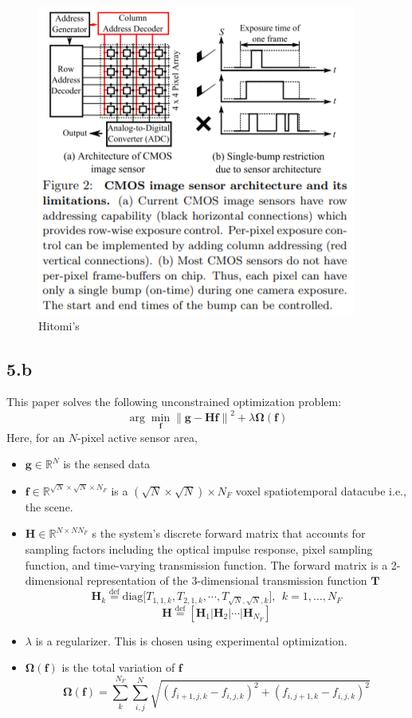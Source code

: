 \documentclass[12pt]{article}
\begin{document}
\begin{figure}[ht]
	\centering
	\includegraphics[scale=0.75]{Hitomi.png}
	\caption{Hitomi's}
\end{figure}
\subsection*{5.b}
This paper solves the following unconstrained optimization problem:
$$\arg \min_{\mathbf{f}}\left\lVert\mathbf{g - Hf}\right\rVert^2 + \lambda \mathbf{\Omega}(\mathbf{f}) $$
Here, for an $N$-pixel active sensor area, 
\begin{itemize}
\item $\mathbf{g} \in \mathbb{R}^N$ is the sensed data
\item $\mathbf{f} \in \mathbb{R}^{\sqrt{N} \times \sqrt{N} \times N_F}$ is a $(\sqrt{N} \times \sqrt{N}) \times N_F$ voxel spatiotemporal datacube i.e., the scene.
\item $\mathbf{H} \in \mathbb{R}^{N\times NN_F}$ s the system’s discrete forward matrix that accounts for sampling factors
including the optical impulse response, pixel sampling function, and time-varying transmission
function. The forward matrix is a 2-dimensional representation of the 3-dimensional transmission function $\mathbf{T}$
$$\mathbf{H}_k \stackrel{\text{def}}{=} \text{diag} \bigg[T_{1,1,k}, T_{2,1,k}, \cdots, T_{\sqrt{N}, \sqrt{N}, k}\bigg], \:\: k = 1, \ldots, N_F$$
$$\mathbf{H} \stackrel{\text{def}}{=} [\mathbf{H}_1\big| \mathbf{H}_2\big| \cdots \big| \mathbf{H}_{N_F} ]$$
\item $\lambda$ is a regularizer. This is chosen using experimental optimization.
\item $\mathbf{\Omega}(\mathbf{f})$ is the total variation of $\mathbf{f}$
$$\mathbf{\Omega}(\mathbf{f}) = \sum \limits_{k}^{N_F} \sum \limits_{i,j}^N \sqrt{(f_{i+1,j,k} - f_{i,j,k})^2 + (f_{i,j+1,k} - f_{i,j,k})^2}$$
\end{itemize} 
\end{document}
